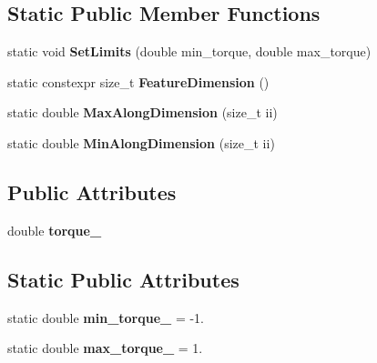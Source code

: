 \subsection*{Static Public Member Functions}
\begin{DoxyCompactItemize}
\item 
\hypertarget{structrl_1_1_inverted_pendulum_action_afab6800d178b15040d0ebbc31baf4c14}{}\label{structrl_1_1_inverted_pendulum_action_afab6800d178b15040d0ebbc31baf4c14} 
static void {\bfseries Set\+Limits} (double min\+\_\+torque, double max\+\_\+torque)
\item 
\hypertarget{structrl_1_1_inverted_pendulum_action_aa180acad4dc081aed0a5639141f4cda6}{}\label{structrl_1_1_inverted_pendulum_action_aa180acad4dc081aed0a5639141f4cda6} 
static constexpr size\+\_\+t {\bfseries Feature\+Dimension} ()
\item 
\hypertarget{structrl_1_1_inverted_pendulum_action_ad83c2b6dbdcf0fe0e7e46df1b6a7668c}{}\label{structrl_1_1_inverted_pendulum_action_ad83c2b6dbdcf0fe0e7e46df1b6a7668c} 
static double {\bfseries Max\+Along\+Dimension} (size\+\_\+t ii)
\item 
\hypertarget{structrl_1_1_inverted_pendulum_action_aea38cad833905876cc5c56d653ca8dce}{}\label{structrl_1_1_inverted_pendulum_action_aea38cad833905876cc5c56d653ca8dce} 
static double {\bfseries Min\+Along\+Dimension} (size\+\_\+t ii)
\end{DoxyCompactItemize}
\subsection*{Public Attributes}
\begin{DoxyCompactItemize}
\item 
\hypertarget{structrl_1_1_inverted_pendulum_action_a06cb28fd3554985bfd6686e43749ba73}{}\label{structrl_1_1_inverted_pendulum_action_a06cb28fd3554985bfd6686e43749ba73} 
double {\bfseries torque\+\_\+}
\end{DoxyCompactItemize}
\subsection*{Static Public Attributes}
\begin{DoxyCompactItemize}
\item 
\hypertarget{structrl_1_1_inverted_pendulum_action_a8528d08456532e7ed1f5a6db231b1f7c}{}\label{structrl_1_1_inverted_pendulum_action_a8528d08456532e7ed1f5a6db231b1f7c} 
static double {\bfseries min\+\_\+torque\+\_\+} = -\/1.
\item 
\hypertarget{structrl_1_1_inverted_pendulum_action_a6e16eacb6385fa7cbed55574aa289d25}{}\label{structrl_1_1_inverted_pendulum_action_a6e16eacb6385fa7cbed55574aa289d25} 
static double {\bfseries max\+\_\+torque\+\_\+} = 1.
\end{DoxyCompactItemize}



